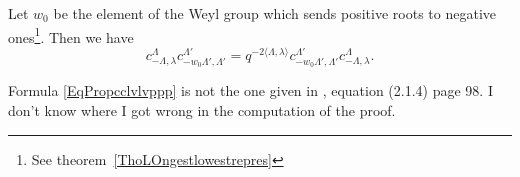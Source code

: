 \begin{proposition}
	Let \( w_0\) be the element of the Weyl group which sends positive roots to negative ones\footnote{See theorem~\ref{ThoLOngestlowestrepres}}. Then we have
	\begin{equation}        \label{EqPropcclvlvppp}
		c^{\Lambda}_{-\Lambda,\lambda}c^{\Lambda'}_{-w_0\Lambda',\Lambda'}=q^{-2\langle \Lambda, \lambda\rangle }c^{\Lambda'}_{-w_0\Lambda',\Lambda'}c^{\Lambda}_{-\Lambda,\lambda}.
	\end{equation}
\end{proposition}

\begin{probleme}
	Formula \eqref{EqPropcclvlvppp} is not the one given in \cite{SoibelmanI}, equation (2.1.4) page 98. I don't know where I got wrong in the computation of the proof.
\end{probleme}

